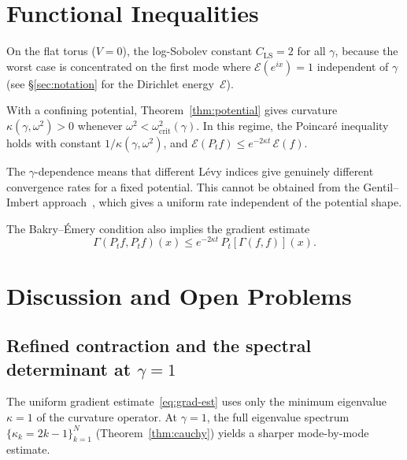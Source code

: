 \documentclass[11pt,a4paper]{article}
\theoremstyle{plain}
\theoremstyle{definition}
\theoremstyle{remark}
\begin{document}
\section{Functional Inequalities}\label{sec:func-ineq}

On the flat torus ($V = 0$), the log-Sobolev constant
$C_{\mathrm{LS}} = 2$ for all $\gamma$, because the worst case
is concentrated on the first mode where
$\mathcal{E}(e^{ix}) = 1$
independent of $\gamma$ (see \S\ref{sec:notation}
for the Dirichlet energy~$\mathcal{E}$).

With a confining potential, Theorem~\ref{thm:potential} gives
curvature $\kappa(\gamma,\omega^2) > 0$ whenever
$\omega^2 < \omega^2_{\mathrm{crit}}(\gamma)$.
In this regime, the Poincar\'e inequality holds with constant
$1/\kappa(\gamma,\omega^2)$, and
$\mathcal{E}(P_t f) \leq e^{-2\kappa t}\,\mathcal{E}(f)$.

The $\gamma$-dependence means that different L\'evy indices give
genuinely different convergence rates for a fixed potential.
This cannot be obtained from the
Gentil--Imbert approach~\cite{GentilImbert2008}, which gives
a uniform rate independent of the potential shape.

The Bakry--\'Emery condition also implies the gradient estimate
\begin{equation}\label{eq:grad-est}
  \Gamma(P_t f, P_t f)(x) \leq e^{-2\kappa t}\,P_t[\Gamma(f,f)](x).
\end{equation}


\section{Discussion and Open Problems}\label{sec:discussion}

\subsection{Refined contraction and the spectral determinant at $\gamma = 1$}

The uniform gradient estimate~\eqref{eq:grad-est} uses only
the minimum eigenvalue $\kappa = 1$ of the curvature operator.
At $\gamma = 1$, the full eigenvalue spectrum
$\{\kappa_k = 2k-1\}_{k=1}^N$ (Theorem~\ref{thm:cauchy})
yields a sharper mode-by-mode estimate.
\end{document}
